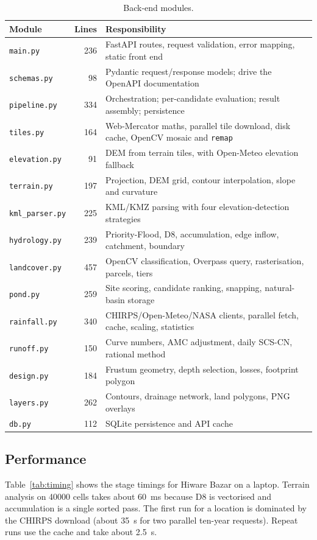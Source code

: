 \documentclass[11pt,a4paper]{article}
\newcommand{\code}[1]{\texttt{\small #1}}
\begin{document}
\begin{table}[H]
\centering\small
\caption{Back-end modules.}
\label{tab:modules}
\begin{tabularx}{\textwidth}{@{}lrY@{}}
\toprule
Module & Lines & Responsibility \\
\midrule
\code{main.py} & 236 & FastAPI routes, request validation, error mapping, static front end \\
\code{schemas.py} & 98 & Pydantic request/response models; drive the OpenAPI documentation \\
\code{pipeline.py} & 334 & Orchestration; per-candidate evaluation; result assembly; persistence \\
\code{tiles.py} & 164 & Web-Mercator maths, parallel tile download, disk cache, OpenCV mosaic and \code{remap} \\
\code{elevation.py} & 91 & DEM from terrain tiles, with Open-Meteo elevation fallback \\
\code{terrain.py} & 197 & Projection, DEM grid, contour interpolation, slope and curvature \\
\code{kml\_parser.py} & 225 & KML/KMZ parsing with four elevation-detection strategies \\
\code{hydrology.py} & 239 & Priority-Flood, D8, accumulation, edge inflow, catchment, boundary \\
\code{landcover.py} & 457 & OpenCV classification, Overpass query, rasterisation, parcels, tiers \\
\code{pond.py} & 259 & Site scoring, candidate ranking, snapping, natural-basin storage \\
\code{rainfall.py} & 340 & CHIRPS/Open-Meteo/NASA clients, parallel fetch, cache, scaling, statistics \\
\code{runoff.py} & 150 & Curve numbers, AMC adjustment, daily SCS-CN, rational method \\
\code{design.py} & 184 & Frustum geometry, depth selection, losses, footprint polygon \\
\code{layers.py} & 262 & Contours, drainage network, land polygons, PNG overlays \\
\code{db.py} & 112 & SQLite persistence and API cache \\
\bottomrule
\end{tabularx}
\end{table}

\subsection{Performance}
Table~\ref{tab:timing} shows the stage timings for Hiware Bazar on a laptop. Terrain analysis
on \num{40000} cells takes about \SI{60}{ms} because D8 is vectorised and accumulation is a
single sorted pass. The first run for a location is dominated by the CHIRPS download (about
\SI{35}{s} for two parallel ten-year requests). Repeat runs use the cache and take about
\SI{2.5}{s}.
\end{document}
